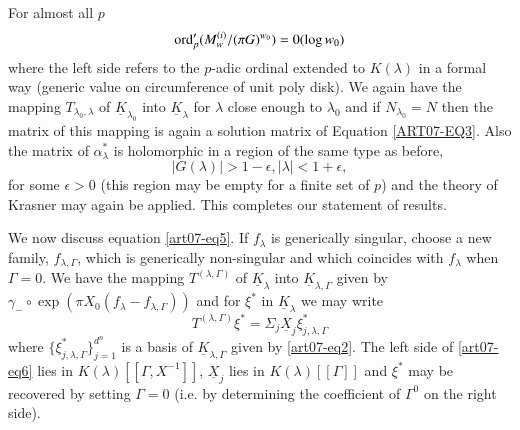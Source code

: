 For almost all $p$
\begin{equation}
\operatorname{\mathrm{ord}}'_{p}(M^{(i)}_{w}/(\pi G)^{w_{0}})=0(\log w_{0})\label{art07-eq6}
\end{equation}
where the left side refers to the $p$-adic ordinal extended to $K(\lambda)$ in a formal way (generic value on circumference of unit poly disk). We again have the mapping $T_{\lambda_{0},\lambda}$ of $\underline{K}_{\lambda_{0}}$ into $\underline{K}_{\lambda}$ for $\lambda$ close enough to $\lambda_{0}$ and if $N_{\lambda_{0}}=N$ then the matrix of this mapping is again a solution matrix of Equation \eqref{ART07-EQ3}. Also the matrix of $\alpha^{*}_{\lambda}$ is holomorphic in a region of the same type as before,
$$
|G(\lambda)|>1-\epsilon, |\lambda|<1+\epsilon,
$$
for some $\epsilon>0$ (this region may be empty for a finite set of $p$) and the theory of Krasner may again be applied. This completes our statement of results.

We now discuss equation \eqref{art07-eq5}. If $f_{\lambda}$ is generically singular, choose a new family, $f_{\lambda,\Gamma}$, which is generically non-singular and which coincides with $f_{\lambda}$ when $\Gamma=0$. We have the mapping $T^{(\lambda,\Gamma)}$ of $\underline{K}_{\lambda}$ into $\underline{K}_{\lambda,\Gamma}$ given by $\gamma_{-}\circ \exp (\pi X_{0}(f_{\lambda}-f_{\lambda,\Gamma}))$ and for $\xi^{*}$ in $\underline{K}_{\lambda}$ we may write
\begin{equation}
T^{(\lambda,\Gamma)}\xi^{*}=\Sigma_{j}\underline{X}_{j}\xi^{*}_{j,\lambda,\Gamma}\label{art07-eq7}
\end{equation}
where $\{\xi^{*}_{j,\lambda,\Gamma}\}^{d^{n}}_{j=1}$ is a basis of $\underline{K}_{\lambda,\Gamma}$ given by \eqref{art07-eq2}. The left side of \eqref{art07-eq6} lies in $K(\lambda)[[\Gamma,X^{-1}]]$, $\underline{X}_{j}$ lies in $K(\lambda)[[\Gamma]]$ and $\xi^{*}$ may be recovered by setting $\Gamma=0$ (i.e. by determining the coefficient of $\Gamma^{0}$ on the right side).

